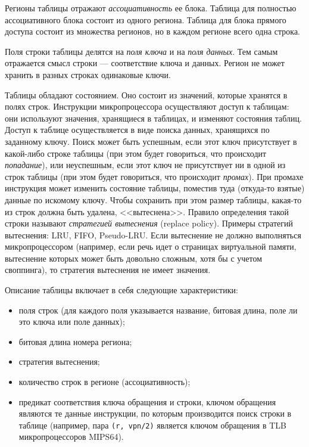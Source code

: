 \documentclass[14pt]{extreport}
\newcommand{\LRU}{\textsf{LRU}\xspace}
\newcommand{\FIFO}{\textsf{FIFO}\xspace}
\newcommand{\PseudoLRU}{\textsf{Pseudo-LRU}\xspace}
\begin{document}
Регионы таблицы отражают \emph{ассоциативность} ее блока. Таблица для полностью
ассоциативного блока состоит из одного региона. Таблица для блока прямого
доступа состоит из множества регионов, но в каждом регионе всего одна строка.

Поля строки таблицы делятся на \emph{поля ключа} и на \emph{поля данных}. Тем
самым отражается смысл строки --- соответствие ключа и данных. Регион не может
хранить в разных строках одинаковые ключи.

Таблицы обладают состоянием. Оно состоит из значений, которые хранятся в полях
строк. Инструкции микропроцессора осуществляют доступ к таблицам: они используют
значения, хранящиеся в таблицах, и изменяют состояния таблиц. Доступ к таблице
осуществляется в виде поиска данных, хранящихся по заданному ключу. Поиск может
быть успешным, если этот ключ присутствует в какой-либо строке таблицы (при этом
будет говориться, что происходит \emph{попадание}), или неуспешным, если этот
ключ не присутствует ни в одной из строк таблицы (при этом будет говориться, что
происходит \emph{промах}). При промахе инструкция может изменить состояние
таблицы, поместив туда (откуда-то взятые) данные по искомому ключу. Чтобы
сохранить при этом размер таблицы, какая-то из строк должна быть удалена,
<<вытеснена>>. Правило определения такой строки называют \emph{стратегией
вытеснения} (replace policy). Примеры стратегий вытеснения: \LRU, \FIFO,
\PseudoLRU. Если вытеснение не должно выполняться микропроцессором (например,
если речь идет о страницах виртуальной памяти, вытеснение которых может быть
довольно сложным, хотя бы с учетом своппинга), то стратегия вытеснения не имеет
значения.

Описание таблицы включает в себя следующие характеристики:
\begin{itemize}
    \item поля строк (для каждого поля указывается название, битовая длина, поле
ли это ключа или поле данных);
    \item битовая длина номера региона;
    \item стратегия вытеснения;
    \item количество строк в регионе (ассоциативность);
    \item предикат соответствия ключа обращения и строки, ключом обращения
являются те данные инструкции, по которым производится поиск строки в таблице
(например, пара \texttt{(r, vpn/2)} является ключом обращения в TLB
микропроцессоров MIPS64).
\end{itemize}
\end{document}

